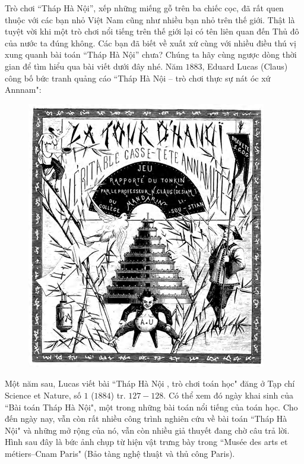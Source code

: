 	Trò chơi “Tháp Hà Nội”, xếp những miếng gỗ trên ba chiếc cọc, đã rất quen thuộc với các bạn nhỏ Việt Nam cũng như nhiều bạn nhỏ trên thế giới. Thật là tuyệt vời khi một trò chơi nổi tiếng trên thế giới lại có tên liên quan đến Thủ đô của nước ta đúng không. Các bạn đã biết về xuất xứ cùng với nhiều điều thú vị xung quanh bài toán “Tháp Hà Nội” chưa? Chúng ta hãy cùng ngược dòng thời gian để tìm hiểu qua bài viết dưới đây nhé.
	\vskip 0.1cm
	Năm $1883$, Eduard Lucas (Claus) công bố  bức tranh quảng cáo ``Tháp Hà Nội --  trò chơi thực sự nát óc xứ Annnam":
	\begin{figure}[H]
		\centering
		\vspace*{-5pt}
		\captionsetup{labelformat= empty, justification=centering}
		\includegraphics[width=0.4\linewidth]{1.1}
		\vspace*{-10pt}
	\end{figure}
	Một năm sau, Lucas viết bài ``Tháp Hà Nội , trò chơi toán học" đăng ở Tạp chí Science et Nature, số $1$ ($1884$) tr. $127-128$. Có thể xem đó ngày khai sinh của ``Bài toán Tháp Hà Nội", một trong những bài toán nổi tiếng của toán học. Cho đến ngày nay, vẫn còn rất nhiều công trình nghiên cứu về bài toán ``Tháp Hà Nội" và những mở rộng của nó, vẫn còn nhiều giả thuyết đang chờ câu trả lời.
	\vskip 0.1cm
	Hình sau đây là bức ảnh chụp từ hiện vật trưng bày trong ``Musée des arts et métiers--Cnam Paris" (Bảo tàng nghệ thuật và thủ công Paris). 
